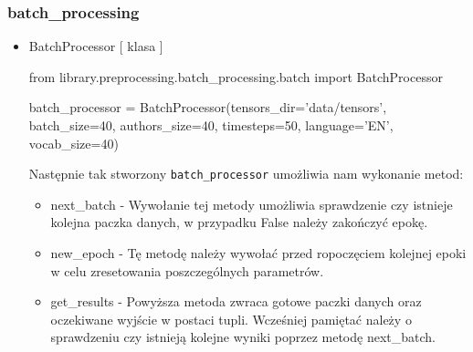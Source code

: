 \subsubsection{batch\_processing}

\myspace
{}
\myspace

\begin{itemize}

\item {BatchProcessor [ klasa ] }
\begin{import}
from library.preprocessing.batch_processing.batch import BatchProcessor

batch_processor = BatchProcessor(tensors_dir='data/tensors',
                                             batch_size=40,
                                             authors_size=40,
                                             timesteps=50,
                                             language='EN',
                                             vocab_size=40)
\end{import}

Następnie tak stworzony \texttt{batch\_processor} umożliwia nam wykonanie metod:

\begin{itemize}
	\item {next\_batch } - 
	Wywołanie tej metody umożliwia sprawdzenie czy istnieje kolejna paczka danych, w przypadku False
	należy zakończyć epokę.
	
	\item {new\_epoch } - 
	Tę metodę należy wywołać przed ropoczęciem kolejnej epoki w celu zresetowania poszczególnych 
	parametrów.
	
	\item { get\_results } - 
	Powyższa metoda zwraca gotowe paczki danych oraz oczekiwane wyjście w postaci tupli. 
	Wcześniej pamiętać należy o sprawdzeniu czy istnieją kolejne wyniki poprzez metodę next\_batch.
\end{itemize}

\end{itemize}